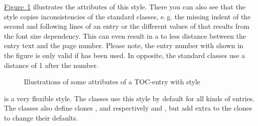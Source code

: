 \begin{description}
  \hyperref[fig:tocbasic.largetocline]%
  {Figure~\ref*{fig:tocbasic.largetocline}} illustrates the attributes of
  this style. There you can also see that the style copies inconsistencies of
  the standard classes, e.\,g. the missing indent of the second and following
  lines of an entry or the different values of  that results
  from the font size dependency. This can even result in a to less distance
  between the entry text and the page number. Please note, the entry number
  with shown in the figure is only valid if  has been
  used. In opposite, the standard classes use a distance of 1 after
  the number.
  \begin{figure}
    \centering
    \caption{Illustrations of some attributes of a TOC-entry with style 
      }
    \label{fig:tocbasic.largetocline}
  \end{figure}
\item[\PValue{tocline}] is a very flexible style. The \KOMAScript{} classes
  use this style by default for all kinds of entries. The classes also define
  clones ,  and  respectively
   and , but add extra
   to the clones to change their defaults.


\end{description}
